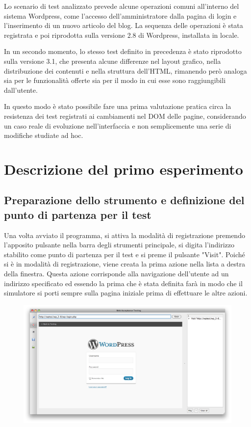 Lo scenario di test analizzato prevede alcune operazioni comuni all'interno del sistema Wordpress, come l'accesso dell'amministratore dalla pagina di login e l'inserimento di un nuovo articolo del blog. La sequenza delle operazioni è stata registrata e poi riprodotta sulla versione 2.8 di Wordpress, installata in locale. 

In un secondo momento, lo stesso test definito in precedenza è stato riprodotto sulla versione 3.1, che presenta alcune differenze nel layout grafico, nella distribuzione dei contenuti e nella struttura dell'HTML, rimanendo però analoga sia per le funzionalità offerte sia per il modo in cui esse sono raggiungibili dall'utente. 

In questo modo è stato possibile fare una prima valutazione pratica circa la resistenza dei test registrati ai cambiamenti nel DOM delle pagine, considerando un caso reale di evoluzione nell'interfaccia e non semplicemente una serie di modifiche studiate ad hoc.

\section{Descrizione del primo esperimento}

\subsection{Preparazione dello strumento e definizione del punto di partenza per il test}

Una volta avviato il programma, si attiva la modalità di registrazione premendo l'apposito pulsante nella barra degli strumenti principale, si digita l'indirizzo stabilito come punto di partenza per il test e si preme il pulsante "Visit". Poiché si è in modalità di registrazione, viene creata la prima azione nella lista a destra della finestra. Questa azione corrisponde alla navigazione dell'utente ad un indirizzo specificato ed essendo la prima che è stata definita farà in modo che il simulatore si porti sempre sulla pagina iniziale prima di effettuare le altre azioni.

\begin{figure}[htbp]
\begin{center}
\includegraphics[width=\textwidth]{images/wp_tour/1_login.png}
\end{center}
\end{figure}
 

